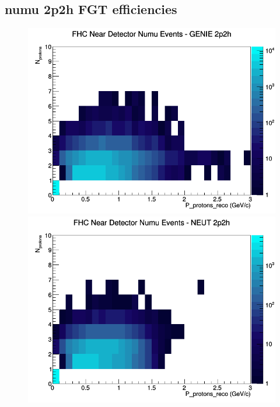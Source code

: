 \subsection{numu 2p2h FGT efficiencies}
\begin{figure}[h]
\includegraphics[width=\linewidth]{eff_N_P/FGT/protons/2p2h_FHC_ND_numu_N_P_GENIE.png}
\endminipage
{}
\includegraphics[width=\linewidth]{eff_N_P/FGT/protons/2p2h_FHC_ND_numu_N_P_NEUT.png}
\endminipage
{}

\end{figure}
